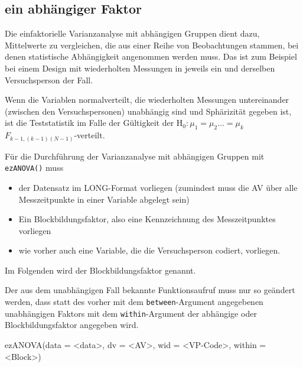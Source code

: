 \documentclass[
]{book}
\newenvironment{Shaded}{\begin{snugshade}}{\end{snugshade}}
\newcommand{\AttributeTok}[1]{\textcolor[rgb]{0.77,0.63,0.00}{#1}}
\newcommand{\FunctionTok}[1]{\textcolor[rgb]{0.00,0.00,0.00}{#1}}
\newcommand{\NormalTok}[1]{#1}
\newcommand{\SpecialCharTok}[1]{\textcolor[rgb]{0.00,0.00,0.00}{#1}}
\providecommand{\tightlist}{%
  \setlength{\itemsep}{0pt}\setlength{\parskip}{0pt}}
\begin{document}
\hypertarget{ein-abhuxe4ngiger-faktor}{%
\subsection{ein abhängiger Faktor}\label{ein-abhuxe4ngiger-faktor}}

Die einfaktorielle Varianzanalyse mit abhängigen Gruppen dient dazu, Mittelwerte zu vergleichen, die aus einer Reihe von Beobachtungen stammen, bei denen statistische Abhängigkeit angenommen werden muss. Das ist zum Beispiel bei einem Design mit wiederholten Messungen in jeweils ein und derselben Versuchsperson der Fall.

Wenn die Variablen normalverteilt, die wiederholten Messungen untereinander (zwischen den Versuchspersonen) unabhängig sind und Sphärizität gegeben ist, ist die Teststatistik im Falle der Gültigkeit der \(\text{H}_0: {\mu}_1 = {\mu}_2 \ldots = {\mu}_k\) \(F_{k-1,(k-1)(N-1)}\)-verteilt.

Für die Durchführung der Varianzanalyse mit abhängigen Gruppen mit \texttt{ezANOVA()} muss

\begin{itemize}
\tightlist
\item
  der Datensatz im LONG-Format vorliegen (zumindest muss die AV über alle Messzeitpunkte in einer Variable abgelegt sein)
\item
  Ein Blockbildungsfaktor, also eine Kennzeichnung des Messzeitpunktes vorliegen
\item
  wie vorher auch eine Variable, die die Versuchsperson codiert, vorliegen.
\end{itemize}

Im Folgenden wird der Blockbildungsfaktor genannt.

Der aus dem unabhängigen Fall bekannte Funktionsaufruf muss nur so geändert werden, dass statt des vorher mit dem \texttt{between}-Argument angegebenen unabhängigen Faktors mit dem \texttt{within}-Argument der abhängige oder Blockbildungsfaktor angegeben wird.

\begin{Shaded}
\begin{Highlighting}[]
\FunctionTok{ezANOVA}\NormalTok{(}\AttributeTok{data =} \SpecialCharTok{\textless{}}\NormalTok{data}\SpecialCharTok{\textgreater{}}\NormalTok{, }
        \AttributeTok{dv =} \SpecialCharTok{\textless{}}\NormalTok{AV}\SpecialCharTok{\textgreater{}}\NormalTok{, }
        \AttributeTok{wid =} \SpecialCharTok{\textless{}}\NormalTok{VP}\SpecialCharTok{{-}}\NormalTok{Code}\SpecialCharTok{\textgreater{}}\NormalTok{,}
        \AttributeTok{within =} \SpecialCharTok{\textless{}}\NormalTok{Block}\SpecialCharTok{\textgreater{}}\NormalTok{)}
\end{Highlighting}
\end{Shaded}
\end{document}

